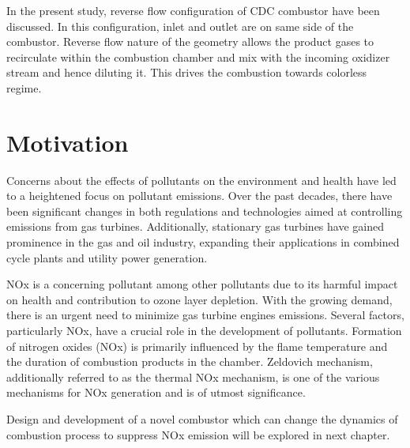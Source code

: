 In the present study, reverse flow configuration of CDC combustor have been discussed. In this configuration, inlet and outlet are on same side of the combustor. Reverse flow nature of the geometry allows the product gases to recirculate within the combustion chamber and mix with the incoming oxidizer stream and hence diluting it. This drives the combustion towards colorless regime.

\section{Motivation}
Concerns about the effects of pollutants on the environment and health have led to a heightened focus on pollutant emissions. Over the past decades, there have been significant changes in both regulations and technologies aimed at controlling emissions from gas turbines. Additionally, stationary gas turbines have gained prominence in the gas and oil industry, expanding their applications in combined cycle plants and utility power generation.

NOx is a concerning pollutant among other pollutants due to its harmful impact on health and contribution to ozone layer depletion. With the growing demand, there is an urgent need to minimize gas turbine engines emissions. Several factors, particularly NOx, have a crucial role in the development of pollutants. Formation of nitrogen oxides (NOx) is primarily influenced by the flame temperature and the duration of combustion products in the chamber. Zeldovich mechanism\cite{LTY2013}, additionally referred to as the thermal NOx mechanism, is one of the various mechanisms for NOx generation and is of utmost significance\cite{LAH2010}.

Design and development of a novel combustor which can change the dynamics of combustion process to suppress NOx emission will be explored in next chapter.

